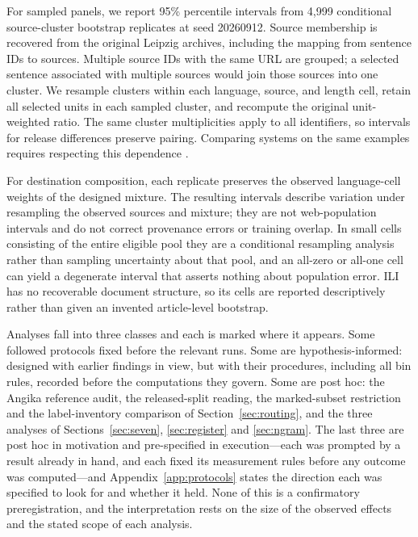 \documentclass[final]{clv2025}
\begin{document}
For sampled panels, we report 95\% percentile intervals from 4,999 conditional source-cluster bootstrap replicates at seed 20260912. Source membership is recovered from the original Leipzig archives, including the mapping from sentence IDs to sources. Multiple source IDs with the same URL are grouped; a selected sentence associated with multiple sources would join those sources into one cluster. We resample clusters within each language, source, and length cell, retain all selected units in each sampled cluster, and recompute the original unit-weighted ratio. The same cluster multiplicities apply to all identifiers, so intervals for release differences preserve pairing. Comparing systems on the same examples requires respecting this dependence \citep{dror-etal-2018-hitchhiker}.

For destination composition, each replicate preserves the observed language-cell weights of the designed mixture. The resulting intervals describe variation under resampling the observed sources and mixture; they are not web-population intervals and do not correct provenance errors or training overlap. In small cells consisting of the entire eligible pool they are a conditional resampling analysis rather than sampling uncertainty about that pool, and an all-zero or all-one cell can yield a degenerate interval that asserts nothing about population error. ILI has no recoverable document structure, so its cells are reported descriptively rather than given an invented article-level bootstrap.

Analyses fall into three classes and each is marked where it appears. Some followed protocols fixed before the relevant runs. Some are hypothesis-informed: designed with earlier findings in view, but with their procedures, including all bin rules, recorded before the computations they govern. Some are post hoc: the Angika reference audit, the released-split reading, the marked-subset restriction and the label-inventory comparison of Section~\ref{sec:routing}, and the three analyses of Sections~\ref{sec:seven}, \ref{sec:register} and \ref{sec:ngram}. The last three are post hoc in motivation and pre-specified in execution---each was prompted by a result already in hand, and each fixed its measurement rules before any outcome was computed---and Appendix~\ref{app:protocols} states the direction each was specified to look for and whether it held. None of this is a confirmatory preregistration, and the interpretation rests on the size of the observed effects and the stated scope of each analysis.
\end{document}
